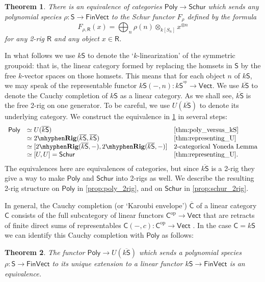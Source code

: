 \documentclass[12pt,reqno]{amsart}
\theoremstyle{plain}
\newtheorem{thm}{Theorem}
\theoremstyle{definition}
\theoremstyle{remark}
\newcommand{\maps}{\colon}
\newcommand{\op}{^\mathrm{op}}
\newcommand{\category}[1]{\mathsf{#1}}
\newcommand{\C}{\category C}
\newcommand{\R}{\category R}
\renewcommand{\S}{\category S}
\newcommand{\namedcat}[1]{\mathsf{#1}}
\newcommand{\Poly}{\namedcat{Poly}}
\newcommand{\Schur}{\namedcat{Schur}}
\newcommand{\TRig}{2\mhyphen\namedbicat{Rig}}
\newcommand{\Vect}{\namedcat{Vect}}
\newcommand{\Fin}{\namedcat{Fin}}
\newcommand{\namedbicat}[1]{\mathbf{#1}}
\newcommand{\ksbar}{\overline{k\S}}
\numberwithin{thm}{section}
\begin{document}
\begin{thm}
\label{thm:schur_versus_poly}
    There is an equivalence of categories $\Poly \to \Schur$ which sends any polynomial species $\rho \maps \S \to \Fin\Vect$ to the Schur functor $F_\rho$ defined by the formula 
    \[   
        F_{\rho, \R}(x) = \bigoplus_n \rho(n) \otimes_{k[S_n]} x^{\otimes n}  
    \]
    for any 2-rig $\R$ and any object $x \in \R$. 
\end{thm}

In what follows we use $k \S$ to denote the `$k$-linearization' of the symmetric groupoid: that is, the linear category formed by replacing the homsets in $\S$ by the free $k$-vector spaces on those homsets. This means that for each object $n$ of $k \S$, we may speak of the representable functor $k \S(-, n) \maps k \S^{\op} \to \Vect$. We use $\overline{k \S}$ to denote the Cauchy completion of $k \S$ as a linear category. As we shall see, $\ksbar$ is the free 2-rig on one generator. To be careful, we use $U(\ksbar)$ to denote its underlying category. We construct the equivalence in \cref{thm:schur_versus_poly} in several steps:
\[ 
\begin{array}{cll}
    \Poly 
    &\simeq U(\ksbar) 
    &\text{\cref{thm:poly_versus_kS}}
    \\&\simeq \TRig(\ksbar, \ksbar) 
    &\text{\cref{thm:representing_U}}
    \\&\simeq [\TRig(\ksbar, -), \TRig(\ksbar, -)] 
    &\text{2-categorical Yoneda Lemma}
    \\&\simeq [U, U]= \Schur
    &\text{\cref{thm:representing_U}.}
\end{array}
\]
The equivalences here are equivalences of categories, but since $\ksbar$ is a 2-rig they give a way to make $\Poly$ and $\Schur$ into 2-rigs as well. We describe the resulting 2-rig structure on $\Poly$ in \cref{prop:poly_2rig}, and on $\Schur$ in \cref{prop:schur_2rig}.

In general, the Cauchy completion (or `Karoubi envelope') $\overline{\C}$ of a linear category $\C$ consists of the full subcategory of linear functors $\C\op \to \Vect$ that are retracts of finite direct sums of representables $\C(-, c) \maps \C\op \to \Vect$ \cite{BorceuxDejean}. In the case $\C = k\S$ we can identify this Cauchy completion with $\Poly$ as follows:

\begin{thm}
\label{thm:poly_versus_kS}
    The functor $\Poly \to U(\ksbar)$ which sends a polynomial species $\rho \maps \S \to \Fin\Vect$ to its unique extension to a linear functor $k\S \to \Fin\Vect$ is an equivalence.
\end{thm}
\end{document}
